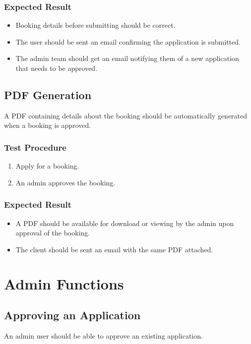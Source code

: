 \documentclass[a4paper, draft]{article}
\begin{document}
\subsubsection{Expected Result}
\begin{itemize}
  \item Booking details before submitting should be correct.
  \item The user should be sent an email confirming the application is submitted.
  \item The admin team should get an email notifying them of a new application that needs to be approved.
\end{itemize}

\newpage
\subsection{PDF Generation} \label{pdf}
A PDF containing details about the booking should be automatically generated when a booking is approved.

\subsubsection{Test Procedure}
\begin{enumerate}
  \item Apply for a booking.
  \item An admin approves the booking.
\end{enumerate}

\subsubsection{Expected Result}
\begin{itemize}
  \item A PDF should be available for download or viewing by the admin upon approval of the booking.
  \item The client should be sent an email with the same PDF attached.
\end{itemize}

\newpage
\section{Admin Functions}
\subsection{Approving an Application}
An admin user should be able to approve an existing application.
\end{document}

